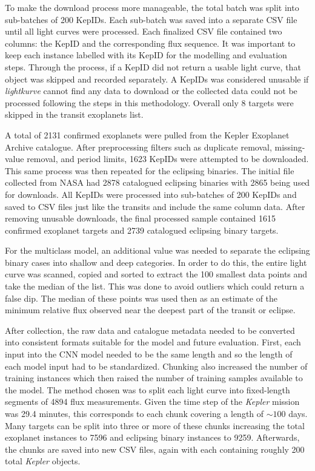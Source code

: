 To make the download process more manageable, the total batch was split into sub-batches of 200 KepIDs. Each sub-batch was saved into a separate CSV file until all light curves were processed. Each finalized CSV file contained two columns: the KepID and the corresponding flux sequence. It was important to keep each instance labelled with its KepID for the modelling and evaluation steps. Through the process, if a KepID did not return a usable light curve, that object was skipped and recorded separately. A KepIDs was considered unusable if \textit{lightkurve} cannot find any data to download or the collected data could not be processed following the steps in this methodology. Overall only 8 targets were skipped in the transit exoplanets list.

A total of 2131 confirmed exoplanets were pulled from the Kepler Exoplanet Archive catalogue. After preprocessing filters such as duplicate removal, missing-value removal, and period limits, 1623 KepIDs were attempted to be downloaded. This same process was then repeated for the eclipsing binaries. The initial file collected from NASA had 2878 catalogued eclipsing binaries with 2865 being used for downloads. All KepIDs were processed into sub-batches of 200 KepIDs and saved to CSV files just like the transits and include the same column data. After removing unusable downloads, the final processed sample contained 1615 confirmed exoplanet targets and 2739 catalogued eclipsing binary targets. 

For the multiclass model, an additional value was needed to separate the eclipsing binary cases into shallow and deep categories. In order to do this, the entire light curve was scanned, copied and sorted to extract the 100 smallest data points and take the median of the list. This was done to avoid outliers which could return a false dip. The median of these points was used then as an estimate of the minimum relative flux observed near the deepest part of the transit or eclipse.

After collection, the raw data and catalogue metadata needed to be converted into consistent formats suitable for the model and future evaluation. First, each input into the CNN model needed to be the same length and so the length of each model input had to be standardized. Chunking also increased the number of training instances which then raised the number of training samples available to the model. The method chosen was to split each light curve into fixed-length segments of 4894 flux measurements. Given the time step of the \textit{Kepler} mission was 29.4 minutes, this corresponds to each chunk covering a length of $\sim 100$ days. Many targets can be split into three or more of these chunks increasing the total exoplanet instances to 7596 and eclipsing binary instances to 9259. Afterwards, the chunks are saved into new CSV files, again with each containing roughly 200 total \textit{Kepler} objects. 

